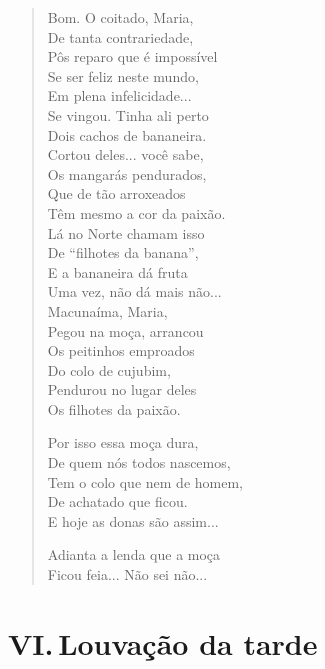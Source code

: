\begin{verse}
Bom. O coitado, Maria,\\
De tanta contrariedade,\\
Pôs reparo que é impossível\\
Se ser feliz neste mundo,\\
Em plena infelicidade...\\
Se vingou. Tinha ali perto\\
Dois cachos de bananeira.\\
Cortou deles... você sabe,\\
Os mangarás pendurados,\\
Que de tão arroxeados\\
Têm mesmo a cor da paixão.\\
Lá no Norte chamam isso\\
De ``filhotes da banana'',\\
E a bananeira dá fruta\\
Uma vez, não dá mais não...\\
Macunaíma, Maria,\\
Pegou na moça, arrancou\\
Os peitinhos emproados\\
Do colo de cujubim,\\
Pendurou no lugar deles\\
Os filhotes da paixão.

Por isso essa moça dura,\\
De quem nós todos nascemos,\\
Tem o colo que nem de homem,\\
De achatado que ficou.\\
E hoje as donas são assim...

Adianta a lenda que a moça\\
Ficou feia... Não sei não...
\end{verse}

\pagebreak
\section{VI.\,Louvação da tarde}

